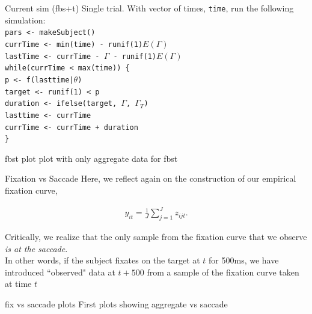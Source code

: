 \documentclass{beamer}
\newcommand{\code}[1]{\texttt{#1}}
\begin{document}
\begin{frame}{Current sim (fbs+t)}
Single trial. With vector of times, \code{time}, run the following simulation:\newline \\

\code{pars <- makeSubject()} \\
\code{currTime <- min(time) - runif(1)}$E(\Gamma)$ \\
\code{lastTime <- currTime - }$\Gamma$\code{ - runif(1)}$E(\Gamma)$\newline \\
\code{while(currTime < max(time)) \{} \\
\hspace{4mm} \code{p <- f(lasttime|}$\theta$\code{)} \\
\hspace{4mm} \code{target <- runif(1) < p} \\
\hspace{4mm} \code{duration <- ifelse(target, }$\Gamma$\code{, }$\Gamma_T$\code{)} \\
\hspace{4mm} \code{lasttime <- currTime} \\
\hspace{4mm} \code{currTime <- currTime + duration} \\
\code{\}}
\end{frame}

\begin{frame}{fbst plot}
plot with only aggregate data for fbst
\end{frame}

\begin{frame}{Fixation vs Saccade}
Here, we reflect again on the construction of our empirical fixation curve, 

\begin{align*}
y_{it} = \frac1J \sum_{j=1}^J z_{ijt}.
\end{align*}

Critically, we realize that the only sample from the fixation curve that we observe \textit{is at the saccade}. \newline \\

In other words, if the subject fixates on the target at $t$ for 500ms, we have introduced ``observed" data at $t + 500$ from a sample of the fixation curve taken at time $t$
\end{frame}


\begin{frame}{fix vs saccade plots}
First plots showing aggregate vs saccade
\end{frame}
\end{document}

